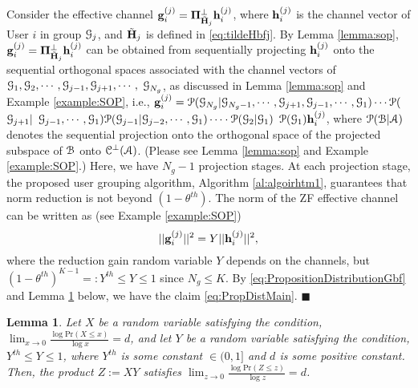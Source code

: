 \documentclass[11pt, draft, onecolumn ]{IEEEtran}
\newtheorem{lemma}{Lemma}
\begin{document}
Consider the effective channel ${\bf g}_i^{(j)}={\bf \Pi}_{\tilde{{\bf H}}_j}^\perp {\bf h}_i^{(j)}$, where ${\bf h}_i^{(j)}$ is the channel vector of User $i$ in group ${\cal G}_j$, and $\tilde{{\bf H}}_j$ is defined in  \eqref{eq:tildeHbfj}.  By Lemma
\ref{lemma:sop},  ${\bf g}_i^{(j)}={\bf \Pi}_{\tilde{{\bf H}}_j}^\perp {\bf h}_i^{(j)}$ can be obtained from sequentially projecting ${\bf h}_i^{(j)}$ onto the sequential orthogonal spaces associated with the channel vectors of ${\cal G}_1,{\cal G}_2,\cdots,{\cal G}_{j-1},{\cal G}_{j+1},\cdots,$ ${\cal G}_{N_g}$, as discussed in Lemma
\ref{lemma:sop} and Example \ref{example:SOP}, i.e.,
${\bf g}_i^{(j)}  =    {\cal P}({\cal G}_{N_g}|{\cal G}_{N_g-1},\cdots,{\cal G}_{j+1},{\cal G}_{j-1},\cdots,{\cal G}_1) \cdots {\cal P}($ ${\cal G}_{j+1}|$ ${\cal G}_{j-1},\cdots,{\cal G}_1)  {\cal P}({\cal G}_{j-1}|{\cal G}_{j-2},\cdots,{\cal G}_1) \cdots\cdot {\cal P}({\cal G}_2|{\cal G}_1)$
 ${\cal P}({\cal G}_1){\bf h}_i^{(j)}$,
 where ${\cal P}({\cal B}|{\cal A})$ denotes
 the sequential projection onto the orthogonal space of the projected subspace of ${\cal B}$ onto ${\cal C}^\perp({\cal A})$. (Please see Lemma
\ref{lemma:sop} and Example \ref{example:SOP}.) Here, we have $N_g-1$ projection stages. At each projection stage, the proposed user grouping algorithm, Algorithm \ref{al:algoirhtm1}, guarantees that norm reduction is not beyond $(1-\theta^{th})$. The norm of the ZF effective channel can be written as (see Example \ref{example:SOP})
\begin{equation}  \label{eq:PropositionDistributionGbf}
||{\bf g}_i^{(j)}||^2 = Y ||{\bf h}_i^{(j)}||^2,
\end{equation}
where the reduction gain random variable $Y$ depends on the channels, but $(1-\theta^{th})^{K-1}=:Y^{th} \le Y \le 1$ since $N_g \le K$.
By \eqref{eq:PropositionDistributionGbf} and Lemma   \ref{eq:lemmaDistribution} below, we have the claim
\eqref{eq:PropDistMain}. \hfill{$\blacksquare$}


\begin{lemma} \label{eq:lemmaDistribution}
       Let $X$ be a random variable  satisfying the condition,
       $\lim_{x \rightarrow 0}\frac{\log \mathrm{Pr}(X \leq x)}{\log x} = d$,      and let $Y$ be a random variable satisfying the condition, $Y^{th} \leq Y \leq 1$, where $Y^{th}$ is some  constant  $\in (0,1]$ and $d$ is some positive constant. Then, the product $Z := XY$ satisfies $\lim_{z \rightarrow 0}\frac{\log \mathrm{Pr}(Z \leq z)}{\log z} = d$.
\end{lemma}
\end{document}
